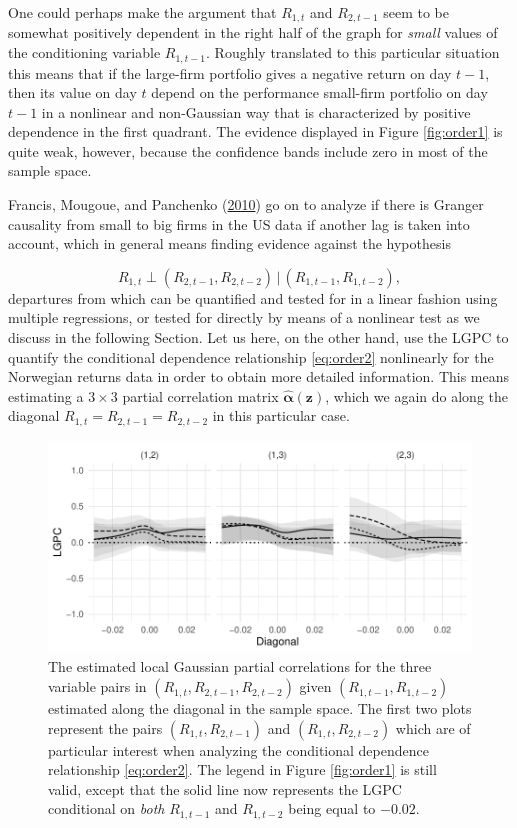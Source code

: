 \documentclass[
  12pt,
  letterpaper]{article}
\newcommand{\z}{\bm{z}}
\newcommand{\hfalpha}{\widehat{\bm{\alpha}}}
\theoremstyle{definition}
\theoremstyle{definition}
\theoremstyle{definition}
\theoremstyle{remark}
\begin{document}
One could perhaps make the argument that \(R_{1,t}\) and \(R_{2,t-1}\) seem to be somewhat positively dependent in the right half of the graph for \emph{small} values of the conditioning variable \(R_{1,t-1}\). Roughly translated to this particular situation this means that if the large-firm portfolio gives a negative return on day \(t-1\), then its value on day \(t\) depend on the performance small-firm portfolio on day \(t-1\) in a nonlinear and non-Gaussian way that is characterized by positive dependence in the first quadrant. The evidence displayed in Figure \ref{fig:order1} is quite weak, however, because the confidence bands include zero in most of the sample space.

Francis, Mougoue, and Panchenko (\protect\hyperlink{ref-fran:moug:vale:2010}{2010}) go on to analyze if there is Granger causality from small to big firms in the US data if another lag is taken into account, which in general means finding evidence against the hypothesis

\begin{equation}
R_{1,t} \perp (R_{2,t-1}, R_{2, t-2}) \,|\, (R_{1, t-1}, R_{1, t-2}),
\label{eq:order2}
\end{equation}
departures from which can be quantified and tested for in a linear fashion using multiple regressions, or tested for directly by means of a nonlinear test as we discuss in the following Section. Let us here, on the other hand, use the LGPC to quantify the conditional dependence relationship \eqref{eq:order2} nonlinearly for the Norwegian returns data in order to obtain more detailed information. This means estimating a \(3\times3\) partial correlation matrix \(\hfalpha(\z)\), which we again do along the diagonal \(R_{1,t} = R_{2,t-1} = R_{2, t-2}\) in this particular case.

\begin{figure}[t]
\centering
\includegraphics{figures/granger-order2}
\caption{The estimated local Gaussian partial correlations for the three variable pairs in $(R_{1,t}, R_{2,t-1}, R_{2, t-2})$ given $(R_{1, t-1}, R_{1, t-2})$ estimated along the diagonal in the sample space. The first two plots represent the pairs $(R_{1,t}, R_{2,t-1})$ and $(R_{1,t}, R_{2,t-2})$ which are of particular interest when analyzing the conditional dependence relationship \eqref{eq:order2}. The legend in Figure \ref{fig:order1} is still valid, except that the solid line now represents the LGPC conditional on \emph{both} $R_{1, t-1}$ and $R_{1, t-2}$ being equal to $-0.02$.}
\label{fig:order2}
\end{figure}
\end{document}
